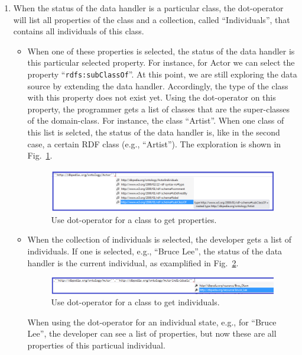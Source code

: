 \documentclass{llncs} %
\begin{document}
\begin{enumerate}
			
  \item When the status of the data handler is a particular class,
		the dot-operator will list all properties of the class and a collection,
		called ``Individuals'', that contains all individuals of this class.
		 \begin{itemize}
			 \item When one of these properties is selected, the status of the data handler is this
			   particular selected property. For instance, for Actor we can select the
				  property ``\texttt{rdfs:subClassOf}''. At this point, we are still
						exploring the data source by extending the data handler. Accordingly,
						the type of the class with this property does not exist yet.
						Using the dot-operator on this property, the programmer gets a list of classes
					 that are the super-classes of the domain-class. For instance, the class ``Artist''.
					 When one class of this list is selcted, the status of the data handler is,
					 like in the second case, a certain RDF class (e.g., ``Artist'').
					  The exploration is shown in Fig.~\ref{fig:showProp}.
			\begin{figure}[h]
				\centering
			\includegraphics[width=0.99\linewidth]{./figs/getProp.png}
			\caption{Use dot-operator for a class to get properties.}
			\label{fig:showProp}
			\end{figure}
					
				
					
				\item When the collection of individuals is selected, the developer gets
					a list of individuals. If one is selected, e.g., ``Bruce Lee'', the
					status of the data handler is the current individual, as examplified in Fig.~\ref{fig:showInd}.
			   \begin{figure}[h]
				 \centering
			   \includegraphics[width=0.99\linewidth]{./figs/getInd.png}
			     \caption{Use dot-operator for a class to get individuals.}
		   	\label{fig:showInd}
		   	\end{figure}
					
					
					When using the dot-operator for an individual state,
					 e.g., for ``Bruce Lee'', the developer can see a list of properties,
					but now these are all properties of this particual individual.
		 \end{itemize}
\end{enumerate}
\end{document}

